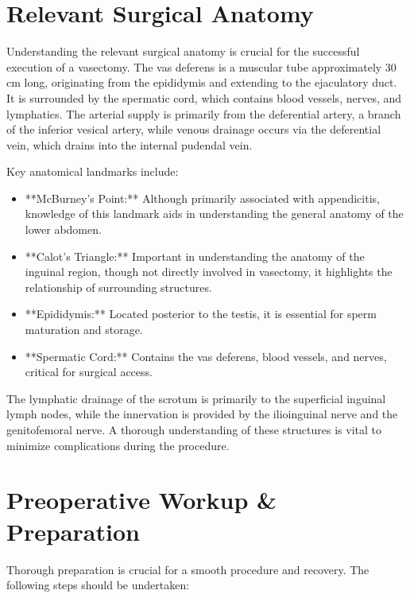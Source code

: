 \section*{Relevant Surgical Anatomy}
Understanding the relevant surgical anatomy is crucial for the successful execution of a vasectomy. The vas deferens is a muscular tube approximately 30 cm long, originating from the epididymis and extending to the ejaculatory duct. It is surrounded by the spermatic cord, which contains blood vessels, nerves, and lymphatics. The arterial supply is primarily from the deferential artery, a branch of the inferior vesical artery, while venous drainage occurs via the deferential vein, which drains into the internal pudendal vein.

Key anatomical landmarks include:

\begin{itemize}
  \item **McBurney's Point:** Although primarily associated with appendicitis, knowledge of this landmark aids in understanding the general anatomy of the lower abdomen.
  \item **Calot's Triangle:** Important in understanding the anatomy of the inguinal region, though not directly involved in vasectomy, it highlights the relationship of surrounding structures.
  \item **Epididymis:** Located posterior to the testis, it is essential for sperm maturation and storage.
  \item **Spermatic Cord:** Contains the vas deferens, blood vessels, and nerves, critical for surgical access.
\end{itemize}

The lymphatic drainage of the scrotum is primarily to the superficial inguinal lymph nodes, while the innervation is provided by the ilioinguinal nerve and the genitofemoral nerve. A thorough understanding of these structures is vital to minimize complications during the procedure.

\section*{Preoperative Workup \& Preparation}
Thorough preparation is crucial for a smooth procedure and recovery. The following steps should be undertaken:

